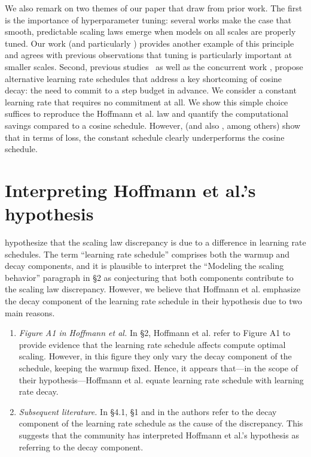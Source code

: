 \documentclass{article}
\makeatletter
\theoremstyle{plain}
\theoremstyle{definition}
\theoremstyle{remark}
\newcommand{\Hoffmann}{Hoffmann et al.\@\xspace}
\makeatother
\begin{document}
{We also remark on two themes of our paper that draw from prior work. The first is the importance of hyperparameter tuning: several works \cite{kaplan2020scaling,ivgi2022scaling,gadre2024language,deepseekai2024deepseek} make the case that smooth, predictable scaling laws emerge when models on all scales are properly tuned. Our work (and particularly ) provides another example of this principle and agrees with previous observations that tuning is particularly important at smaller scales. 
Second, previous studies~\cite{zhai2022scaling,bellagente2024stable,deepseekai2024deepseek,hu2024minicpm} as well as the concurrent work \cite{hagele2024scaling}, propose alternative learning rate schedules that address a key shortcoming of cosine decay: the need to commit to a step budget in advance. We consider a constant learning rate that requires no commitment at all. We show this simple choice suffices to reproduce the \Hoffmann law and quantify the computational savings compared to a cosine schedule. However,  (and also \cite{hoffmann2022empirical}, among others) show that in terms of loss, the constant schedule clearly underperforms the cosine schedule.   }

\section{Interpreting \Hoffmann's hypothesis}\label{app:hoffmann-hypothesis}
\citet{hoffmann2022empirical} hypothesize that the scaling law discrepancy is due to a difference in learning rate schedules. The term ``learning rate schedule'' comprises both the warmup and decay components, and it is plausible to interpret the ``Modeling the scaling behavior'' paragraph in \citet{hoffmann2022empirical} \S 2 as conjecturing that both components contribute to the scaling law discrepancy. 
However, we believe that \Hoffmann emphasize the decay component of the learning rate schedule in their hypothesis due to two main reasons.
\begin{enumerate}
    \item \emph{Figure A1 in \Hoffmann} In \S 2, \Hoffmann refer to Figure A1 to provide evidence that the learning rate schedule affects compute optimal scaling. However, in this figure they only vary the decay component of the schedule, keeping the warmup fixed. Hence, it appears that---in the scope of their hypothesis---\Hoffmann equate learning rate schedule with learning rate decay.
    \item \emph{Subsequent literature.} In \citet{hu2024minicpm} \S 4.1, \citet{hagele2024scaling} \S 1 and in \cite{doe2023new} the authors refer to the decay component of the learning rate schedule as the cause of the discrepancy. This suggests that the community has interpreted \Hoffmann's hypothesis as referring to the decay component.
\end{enumerate}
\end{document}
